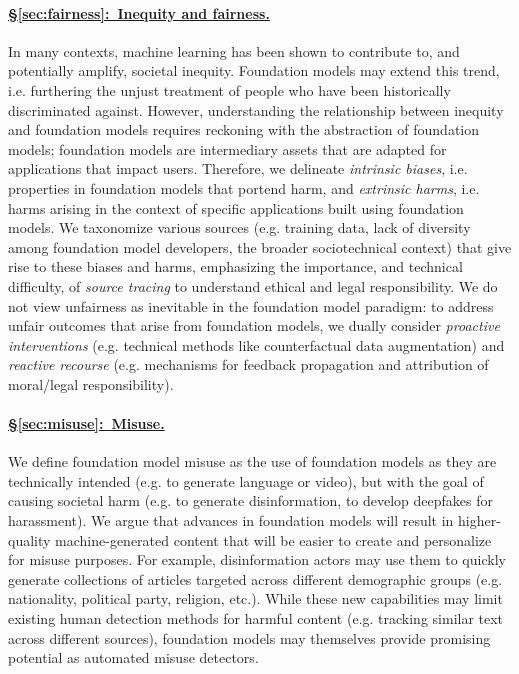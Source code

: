 \paragraph{\hyperref[sec:fairness]{§\ref{sec:fairness}:~Inequity and fairness.}}

In many contexts, machine learning has been shown to contribute to, and potentially amplify, societal inequity. Foundation models may extend this trend, i.e. furthering the unjust treatment of people who have been historically discriminated against. However, understanding the relationship between inequity and foundation models requires reckoning with the abstraction of foundation models; foundation models are intermediary assets that are adapted for applications that impact users. Therefore, we delineate \textit{intrinsic biases}, i.e. properties in foundation models that portend harm, and \textit{extrinsic harms}, i.e. harms arising in the context of specific applications built using foundation models. We taxonomize various sources (e.g. training data, lack of diversity among foundation model developers, the broader sociotechnical context) that give rise to these biases and harms, emphasizing the importance, and technical difficulty, of \textit{source tracing} to understand ethical and legal responsibility. We do not view unfairness as inevitable in the foundation model paradigm: to address unfair outcomes that arise from foundation models, we dually consider \textit{proactive interventions} (e.g. technical methods like counterfactual data augmentation) and \textit{reactive recourse} (e.g. mechanisms for feedback propagation and attribution of moral/legal responsibility). 

\paragraph{\hyperref[sec:misuse]{§\ref{sec:misuse}:~Misuse.}}

We define foundation model misuse as the use of foundation models as they are technically intended (e.g. to generate language or video), but with the goal of causing societal harm (e.g. to generate disinformation, to develop deepfakes for harassment). We argue that advances in foundation models will result in higher-quality machine-generated content that will be easier to create and personalize for misuse purposes. For example, disinformation actors may use them to quickly generate collections of articles targeted across different demographic groups (e.g. nationality, political party, religion, etc.). While these new capabilities may limit existing human detection methods for harmful content (e.g. tracking similar text across different sources), foundation models may themselves provide promising potential as automated misuse detectors.

